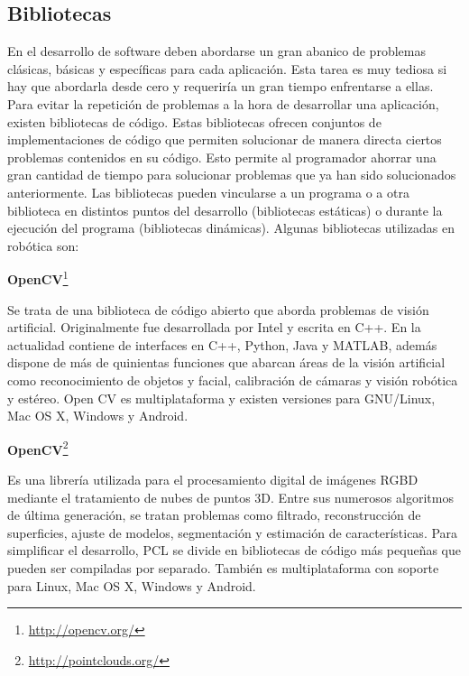 \subsection{Bibliotecas}
En el desarrollo de software deben abordarse un gran abanico de problemas clásicas, básicas y específicas para cada aplicación. Esta tarea es muy tediosa si hay que abordarla desde cero y requeriría un gran tiempo enfrentarse a ellas. Para evitar la repetición de problemas a la hora de desarrollar una aplicación, existen bibliotecas de código. Estas bibliotecas ofrecen conjuntos de implementaciones de código que permiten solucionar de manera directa ciertos problemas contenidos en su código. Esto permite al programador ahorrar una gran cantidad de tiempo para solucionar problemas que ya han sido solucionados anteriormente. Las bibliotecas pueden vincularse a un programa o a otra biblioteca en distintos puntos del desarrollo (bibliotecas estáticas) o durante la ejecución del programa (bibliotecas dinámicas). Algunas bibliotecas utilizadas en robótica son:

	\textbf{OpenCV}\footnote{\url{http://opencv.org/}}

Se trata de una biblioteca de código abierto que aborda problemas de visión artificial. Originalmente fue desarrollada por Intel y escrita en C++. En la actualidad contiene de interfaces en C++, Python, Java y MATLAB, además dispone de más de quinientas funciones que abarcan áreas de la visión artificial como reconocimiento de objetos y facial, calibración de cámaras y visión robótica y estéreo. Open CV es multiplataforma  y existen versiones para GNU/Linux, Mac OS X, Windows y Android.

	\textbf{OpenCV}\footnote{\url{http://pointclouds.org/}}

Es una librería utilizada para el procesamiento digital de imágenes RGBD mediante el tratamiento de nubes de puntos 3D. Entre sus numerosos algoritmos de última generación, se tratan problemas como filtrado, reconstrucción de superficies, ajuste de modelos, segmentación y estimación de características. Para simplificar el desarrollo, PCL se divide en bibliotecas de código  más pequeñas que pueden ser compiladas por separado. También es multiplataforma con soporte para Linux, Mac OS X, Windows y Android.

